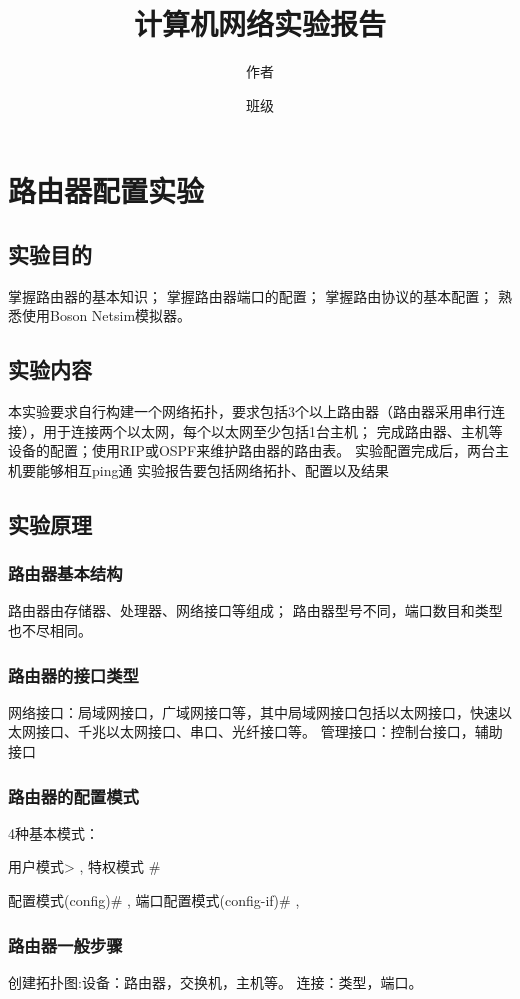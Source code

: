 \documentclass{article}
\title{计算机网络实验报告}
\author{作者 }
\date{班级}
\begin{document}
\maketitle

\section{路由器配置实验}
\subsection{实验目的}
掌握路由器的基本知识；
掌握路由器端口的配置；
掌握路由协议的基本配置；
熟悉使用Boson Netsim模拟器。

\subsection{实验内容}
本实验要求自行构建一个网络拓扑，要求包括3个以上路由器（路由器采用串行连接），用于连接两个以太网，每个以太网至少包括1台主机；
完成路由器、主机等设备的配置；使用RIP或OSPF来维护路由器的路由表。 
实验配置完成后，两台主机要能够相互ping通
实验报告要包括网络拓扑、配置以及结果

\subsection{实验原理}
\subsubsection{路由器基本结构}

路由器由存储器、处理器、网络接口等组成；
路由器型号不同，端口数目和类型也不尽相同。

\subsubsection{路由器的接口类型}

网络接口：局域网接口，广域网接口等，其中局域网接口包括以太网接口，快速以太网接口、千兆以太网接口、串口、光纤接口等。
管理接口：控制台接口，辅助接口
\subsubsection{路由器的配置模式}
4种基本模式：\par
用户模式> ,
特权模式 \# 

配置模式(config)\# ,
端口配置模式(config-if)\# ,

\subsubsection{路由器一般步骤}
创建拓扑图:设备：路由器，交换机，主机等。
连接：类型，端口。
\par
\end{document}
